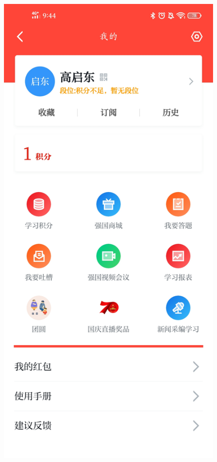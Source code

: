 \documentclass{article}
\begin{document}
\begin{itemize}
\begin{figure}[H]
{\includegraphics[scale=0.1]{xxqg}}
\subfigure[Bilibili]{
\label{Fig.sub.3}
}
\end{figure}
\end{itemize}
\end{document}
